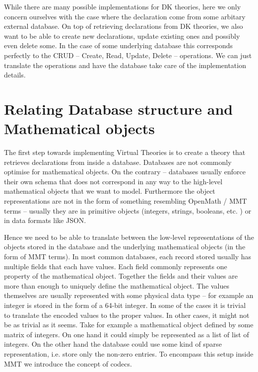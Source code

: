 \documentclass{deliverablereport}
\begin{document}
While there are many possible implementations for DK theories, here we only concern ourselves with the case where the declaration come from some arbitary external database. On top of retrieving declarations from DK theories, we also want to be able to create new declarations, update existing ones and possibly even delete some. In the case of some underlying database this corresponds perfectly to the CRUD -- Create, Read, Update, Delete -- operations. We can just translate the operations and have the database take care of the implementation details. 

\section{Relating Database structure and Mathematical objects}\label{sec:impl}

The first step towards implementing Virtual Theories is to create a theory that retrieves declarations from inside a database. Databases are not commonly optimise for mathematical objects. On the contrary -- databases usually enforce their own schema that does not correspond in any way to the high-level mathematical objects that we want to model. Furthermore the object representations are not in the form of something resembling OpenMath / MMT terms -- usually they are in primitive objects (integers, strings, booleans, etc. ) or in data formats like JSON.

Hence we need to be able to translate between the low-level representations of the objects stored in the database and the underlying mathematical objects (in the form of MMT terms). In most common databases, each record stored usually has multiple fields that each have values. Each field commonly represents one property of the mathematical object. Together the fields and their values are more than enough to uniquely define the mathematical object. The values themselves are usually represented with some physical data type -- for example an integer is stored in the form of a 64-bit integer. In some of the cases it is trivial to translate the encoded values to the proper values. In other cases, it might not be as trivial as it seems. Take for example a mathematical object defined by some matrix of integers. On one hand it could simply be represented as a list of list of integers. On the other hand the database could use some kind of sparse representation, i.e. store only the non-zero entries. To encompass this setup inside MMT we introduce the concept of codecs.
\end{document}
